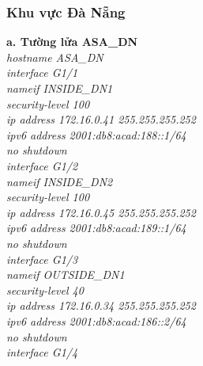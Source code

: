 \documentclass[12pt,a4paper]{report}
\begin{document}
\subsubsection{Khu vực Đà Nẵng}
\hspace*{1cm}\textbf{a. Tường lửa ASA\_DN}\\
\hspace*{2cm}\textit{hostname ASA\_DN\\
\hspace*{2cm}interface G1/1\\
\hspace*{2cm}nameif INSIDE\_DN1\\
\hspace*{2cm}security-level 100\\
\hspace*{2cm}ip address 172.16.0.41 255.255.255.252\\
\hspace*{2cm}ipv6 address 2001:db8:acad:188::1/64\\
\hspace*{2cm}no shutdown\\
\hspace*{2cm}interface G1/2\\
\hspace*{2cm}nameif INSIDE\_DN2\\
\hspace*{2cm}security-level 100\\
\hspace*{2cm}ip address 172.16.0.45 255.255.255.252\\
\hspace*{2cm}ipv6 address 2001:db8:acad:189::1/64\\
\hspace*{2cm}no shutdown\\
\hspace*{2cm}interface G1/3\\
\hspace*{2cm}nameif OUTSIDE\_DN1\\
\hspace*{2cm}security-level 40\\
\hspace*{2cm}ip address 172.16.0.34 255.255.255.252\\
\hspace*{2cm}ipv6 address 2001:db8:acad:186::2/64\\
\hspace*{2cm}no shutdown\\
\hspace*{2cm}interface G1/4\\
}
\end{document}
